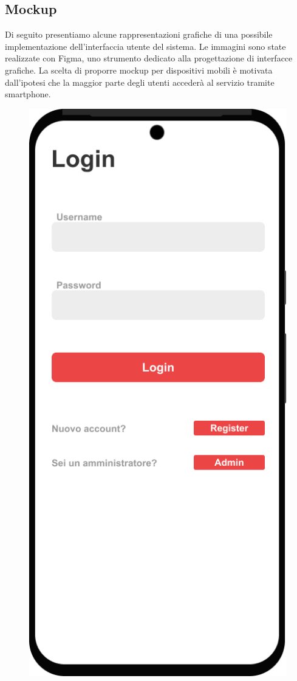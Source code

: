 \subsection{Mockup}
Di seguito presentiamo alcune rappresentazioni grafiche di una possibile implementazione dell'interfaccia utente del sistema. Le immagini sono state realizzate con Figma, uno strumento dedicato alla progettazione di interfacce grafiche. La scelta di proporre mockup per dispositivi mobili è motivata dall'ipotesi che la maggior parte degli utenti accederà al servizio tramite smartphone.
\begin{figure}[H]
    \centering
    \begin{minipage}{0.45\textwidth}
        \centering
        \includegraphics[width=\linewidth]{Images/Login Page.png}

\end{minipage}
\end{figure}
